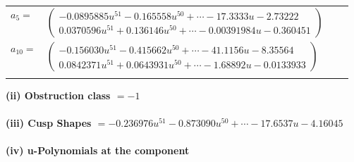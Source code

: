 \documentclass[1p]{elsarticle_modified}
\theoremstyle{definition}
\begin{document}
\begin{tabular}{m{7pt} m{180pt} m{7pt} m{180pt} }
\flushright $a_{5}=$&$\begin{pmatrix}-0.0895885 u^{51}-0.165558 u^{50}+\cdots-17.3333 u-2.73222\\0.0370596 u^{51}+0.136146 u^{50}+\cdots-0.00391984 u-0.360451\end{pmatrix}$ \\
\flushright $a_{10}=$&$\begin{pmatrix}-0.156030 u^{51}-0.415662 u^{50}+\cdots-41.1156 u-8.35564\\0.0842371 u^{51}+0.0643931 u^{50}+\cdots-1.68892 u-0.0133933\end{pmatrix}$\\&\end{tabular}
\flushleft \textbf{(ii) Obstruction class $= -1$}\\~\\
\flushleft \textbf{(iii) Cusp Shapes $= -0.236976 u^{51}-0.873090 u^{50}+\cdots-17.6537 u-4.16045$}\\~\\
\newpage\renewcommand{\arraystretch}{1}
\flushleft \textbf{(iv) u-Polynomials at the component}\newline \\
\end{document}
